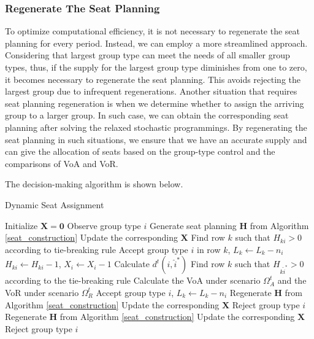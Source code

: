 \subsubsection{Regenerate The Seat Planning}
To optimize computational efficiency, it is not necessary to regenerate the seat planning for every period. Instead, we can employ a more streamlined approach. Considering that largest group type can meet the needs of all smaller group types, thus, if the supply for the largest group type diminishes from one to zero, it becomes necessary to regenerate the seat planning. This avoids rejecting the largest group due to infrequent regenerations. Another situation that requires seat planning regeneration is when we determine whether to assign the arriving group to a larger group. In such case, we can obtain the corresponding seat planning after solving the relaxed stochastic programmings. By regenerating the seat planning in such situations, we ensure that we have an accurate supply and can give the allocation of seats based on the group-type control and the comparisons of VoA and VoR.


The decision-making algorithm is shown below.

\begin{algorithm}[H]
  \caption{Dynamic Seat Assignment}
  {Initialize $\bm{X} = \bm{0}$\;
    Observe group type $i$\;
   {Generate seat planning $\bm{H}$ from Algorithm \ref{seat_construction}\; Update the corresponding $\bm{X}$}
    {Find row $k$ such that $H_{ki} >0$ according to tie-breaking rule\; Accept group type $i$ in row $k$, $L_{k} \gets L_{k} -n_{i}$\; $H_{ki} \gets H_{ki} -1$, $X_{i} \gets X_{i} -1$}
    {Calculate $d^{t}(i, \hat{i}^{*})$\;
    {Find row $k$ such that $H_{k \hat{i}^{*}} > 0$ according to the tie-breaking rule\; 
    Calculate the VoA under scenario $\Omega^{t}_{A}$ and the VoR under scenario $\Omega^{t}_{R}$\;
    {Accept group type $i$, $L_{k} \gets L_{k} - n_{i}$\; Regenerate $\bm{H}$ from Algorithm \ref{seat_construction}\; Update the corresponding $\bm{X}$\;}
    {Reject group type $i$\; Regenerate $\bm{H}$ from Algorithm \ref{seat_construction}\; Update the corresponding $\bm{X}$\;}}
    {Reject group type $i$\;}
    }}
\end{algorithm}








